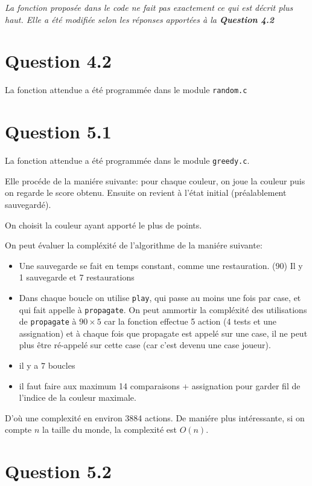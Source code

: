 \documentclass[a4paper,11pt]{article}
\newcommand{\dbend}{{\manual\char127}}
\newenvironment{attention}%
{\description\item[\dbend]\sl}%
{\enddescription}
\begin{document}
\begin{attention}
  La fonction proposée dans le code ne fait pas exactement ce qui est décrit plus haut. Elle a été modifiée selon les réponses apportées à la \textbf{Question 4.2}
\end{attention}

\section*{Question 4.2}

La fonction attendue a été programmée dans le module \texttt{random.c}

\section*{Question 5.1}

La fonction attendue a été programmée dans le module \texttt{greedy.c}.

Elle procéde de la maniére suivante: pour chaque couleur, on joue la couleur puis on regarde le score obtenu. Ensuite on revient à l'état initial (préalablement sauvegardé).

On choisit la couleur ayant apporté le plus de points.

On peut évaluer la compléxité de l'algorithme de la maniére suivante:
\begin{itemize}
\item Une sauvegarde se fait en temps constant, comme une restauration. (90) Il y 1 sauvegarde et 7 restaurations
\item Dans chaque boucle on utilise \texttt{play}, qui passe au moins une fois par case, et qui fait appelle à \texttt{propagate}. On peut ammortir la compléxité des utilisations de \texttt{propagate} à $90\times 5$ car la fonction effectue 5 action (4 tests et une assignation) et à chaque fois que propagate est appelé sur une case, il ne peut plus être ré-appelé sur cette case (car c'est devenu une case joueur).
\item il y a $7$ boucles
\item il faut faire aux maximum 14 comparaisons + assignation pour garder fil de l'indice de la couleur maximale.
\end{itemize}

D'où une complexité en environ 3884 actions. De maniére plus intéressante, si on compte $n$ la taille du monde, la complexité est $O(n)$.

\section*{Question 5.2}
\end{document}
